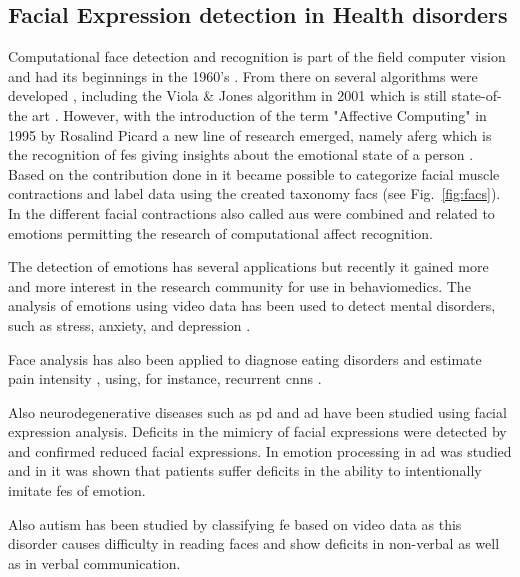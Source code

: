 \subsection{Facial Expression detection in Health disorders}

Computational face detection and recognition is part of the field computer vision and had its beginnings in the 1960's \cite{Bledsoe1966}. From there on several algorithms were developed \cite{Zhao2003}, including the Viola \& Jones algorithm in 2001 which is still state-of-the art \cite{Viola2001}. However, with the
introduction of the term "Affective Computing" in 1995 by Rosalind Picard a new line of research emerged, namely \gls{aferg} which is the recognition of \glspl{fe} giving insights about the emotional state of a person \cite{Huang2010,Anil2016,Pantic2000,Sariyanidi2015}. Based on the contribution done in \cite{Ekman1977} it became possible to categorize facial muscle contractions and label data using the created taxonomy \gls{facs} (see Fig.~\ref{fig:facs}). In \cite{Ekman1997} the different facial contractions also called \glspl{au} were combined and related to emotions permitting the research of computational affect recognition.

The detection of emotions has several applications but recently it gained more and more interest in the research community for use in \gls{behaviomedics}\cite{Valstar2014automatic}. The analysis of emotions using video data has been used to detect mental disorders, such as stress, anxiety, and depression \cite{Holt2016,Valstar2014automatic,Valstar2016avec,Valstar2014avec}. 

Face analysis has also been applied to diagnose eating disorders \cite{Leppanen2017} and estimate pain intensity \cite{Valstar2014automatic}, using, for instance, recurrent \glspl{cnn} \cite{Zhou2016}. 

Also neurodegenerative diseases such as \gls{pd} \cite{Almutiry2016,Bandini2017,Silverdale2016} and \gls{ad} have been studied using facial expression analysis. Deficits in the mimicry of facial expressions were detected by \cite{Livingstone2016} and \cite{Ricciardi2015} confirmed reduced facial expressions. In \cite{Cadieux1997} 
emotion processing in \gls{ad} was studied and in \cite{Gola2017} it was shown that patients suffer deficits in the ability to intentionally imitate \glspl{fe} of emotion.

Also autism has been studied by classifying \gls{fe} based on video data \cite{Valstar2014automatic} as this disorder causes difficulty in reading faces and show deficits in non-verbal as well as in verbal communication.

